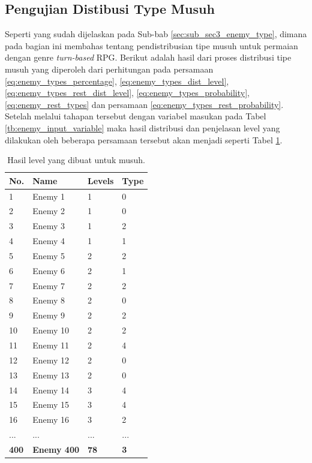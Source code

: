 \subsection{Pengujian Distibusi Type Musuh}
\label{sec:sub_sec4_eval_dist_enemy_type}
\vspace{1ex}

Seperti yang sudah dijelaskan pada Sub-bab \ref{sec:sub_sec3_enemy_type}, dimana pada bagian ini membahas tentang pendistribusian tipe musuh untuk permaian dengan genre \textit{turn-based} RPG. Berikut adalah hasil dari proses distribusi tipe musuh yang diperoleh dari perhitungan pada persamaan \ref{eq:enemy_types_percentage}, \ref{eq:enemy_types_dist_level}, \ref{eq:enemy_types_rest_dist_level}, \ref{eq:enemy_types_probability}, \ref{eq:enemy_rest_types} dan persamaan \ref{eq:enemy_types_rest_probability}. Setelah melalui tahapan tersebut dengan variabel masukan pada Tabel \ref{tb:enemy_input_variable} maka hasil distribusi dan penjelasan level yang dilakukan oleh beberapa persamaan tersebut akan menjadi seperti Tabel \ref{tb:enemy_type_distrib}.

\begin{longtable}{|l|l|l|l|}
	\caption{Hasil level yang dibuat untuk musuh.}
	\label{tb:enemy_type_distrib}\\
	\hline
	\rowcolor[HTML]{C0C0C0} 
	\textbf{No.} & \textbf{Name} & \textbf{Levels} & \textbf{Type} \\ \hline
	1 & Enemy 1 & 1 & 0 \\ \hline
	2 & Enemy 2 & 1 & 0 \\ \hline
	3 & Enemy 3 & 1 & 2 \\ \hline
	4 & Enemy 4 & 1 & 1 \\ \hline
	5 & Enemy 5 & 2 & 2 \\ \hline
	6 & Enemy 6 & 2 & 1 \\ \hline
	7 & Enemy 7 & 2 & 2 \\ \hline
	8 & Enemy 8 & 2 & 0 \\ \hline
	9 & Enemy 9 & 2 & 2 \\ \hline
	10 & Enemy 10 & 2 & 2 \\ \hline
	11 & Enemy 11 & 2 & 4 \\ \hline
	12 & Enemy 12 & 2 & 0 \\ \hline
	13 & Enemy 13 & 2 & 0 \\ \hline
	14 & Enemy 14 & 3 & 4 \\ \hline
	15 & Enemy 15 & 3 & 4 \\ \hline
	16 & Enemy 16 & 3 & 2 \\ \hline
	... & ... & ... & ... \\ \hline
	\textbf{400} & \textbf{Enemy 400} & \textbf{78} & \textbf{3} \\ \hline
\end{longtable}


